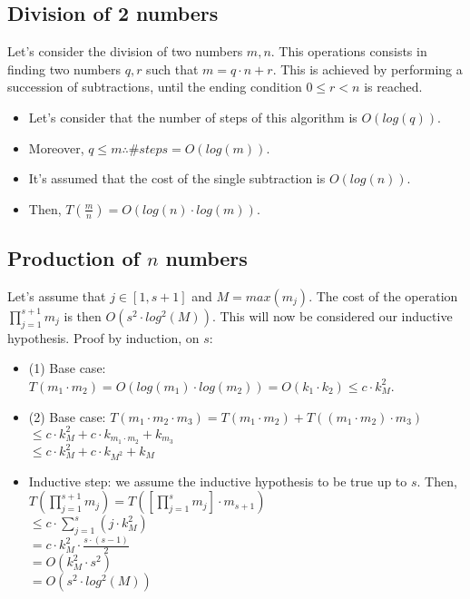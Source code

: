 \documentclass[12pt, a4paper, english]{report}
\begin{document}
\subsection{Division of 2 numbers}
Let's consider the division of two numbers $m, n$. This operations consists in \\ finding two numbers $q, r$ such that $m = q \cdot n + r$. \newline
This is achieved by performing a succession of subtractions, until the ending condition $0 \leq r < n$ is reached. \newline
\begin{itemize}
    \item Let's consider that the number of steps of this algorithm is $O(log(q))$.
    \item Moreover, $q \leq m \therefore \#steps = O(log(m))$.
    \item It's assumed that the cost of the single subtraction is $O(log(n))$.
    \item Then, $T(\frac{m}{n}) = O(log(n) \cdot log(m))$.
\end{itemize}

\subsection{Production of $n$ numbers}
Let's assume that $j \in [1, s+1]$ and $M = max(m_{j})$. \newline
The cost of the operation $\prod_{j = 1}^{s+1} m_{j}$ is then $O(s^{2} \cdot log^{2}(M))$. This will now be considered our inductive hypothesis.\newline
Proof by induction, on $s$:
\begin{itemize}
    \item (1) Base case: $T(m_{1} \cdot m_{2}) = O(log(m_{1}) \cdot log(m_{2})) = O(k_{1} \cdot k_{2}) \leq c \cdot k_{M}^{2}$.
    \item (2) Base case: $T(m_{1} \cdot m_{2} \cdot m_{3}) = T(m_{1} \cdot m_{2}) + T((m_{1} \cdot m_{2}) \cdot m_{3})$ \\ $\leq c \cdot k_{M}^{2} + c \cdot k_{m_{1} \cdot m_{2}} + k_{m_{3}}$ \\ $\leq c \cdot k_{M}^{2} + c \cdot k_{M^{2}} + k_{M}$
    \item Inductive step: we assume the inductive hypothesis to be true up to $s$. Then,
    \\ $T(\prod_{j = 1}^{s+1} m_{j}) = T([\prod_{j = 1}^{s} m_{j}] \cdot m_{s+1})$
    \\ $\leq c \cdot \sum_{j=1}^{s} (j \cdot k_{M}^{2})$
    \\ $= c \cdot k_{M}^{2} \cdot \frac{s \cdot (s-1)}{2}$
    \\ $= O(k_{M}^{2} \cdot s^{2})$
    \\ $= O(s^{2} \cdot log^{2}(M))$
\end{itemize}
\end{document}

